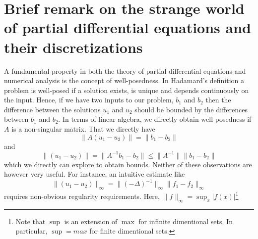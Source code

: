 \section{Brief remark on the strange world of partial differential equations and their discretizations }

A fundamental property in both the theory of partial differential equations and numerical analysis is the
concept of well-posedness. In Hadamard's definition a problem is well-posed if a solution exists, is unique
and depends continuously on the input. Hence, if we have two inputs to our problem, $b_1$ and $b_2$ 
then the difference between the solutions $u_1$ and $u_2$ should be bounded by the differences
between $b_1$ and $b_2$. In terms of linear algebra, we directly obtain well-posedness if
$A$ is a non-singular matrix. That we directly have 
\[
\|A(u_1 - u_2) \| = \|b_1 - b_2\|     
\]
and 
\[
\|(u_1 - u_2) \| = \|A^{-1}b_1 - b_2\| \le  \|A^{-1}\| \|b_1 - b_2\|     
\]
which we directly can explore to obtain bounds. Neither of these observations are however
very useful. 
For instance, an intuitive estimate like  
\[
\|(u_1 - u_2) \|_\infty = \|(-\Delta)^{-1} \|_\infty \|f_1 - f_2\|_\infty     
\]
requires non-obvious regularity requirements. Here, 
$\|f \|_\infty = \sup_x |f(x)|$\footnote{Note that $\sup$ is an 
extension of $\max$ for infinite dimentional sets. In particular, $\sup=max$ for finite dimentional sets.}  

